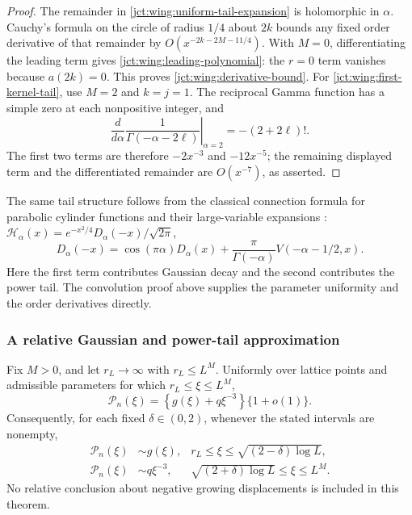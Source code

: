 \begin{proof}
The remainder in \eqref{jct:wing:uniform-tail-expansion} is
holomorphic in $\alpha$.  Cauchy's formula on the circle of radius
$1/4$ about $2k$ bounds any fixed order derivative of that remainder
by $O(x^{-2k-2M-11/4})$.  With $M=0$, differentiating the leading
term gives \eqref{jct:wing:leading-polynomial}: the $r=0$ term vanishes
because $a(2k)=0$.  This proves \eqref{jct:wing:derivative-bound}.
For \eqref{jct:wing:first-kernel-tail}, use $M=2$ and $k=j=1$.
The reciprocal Gamma function has a simple zero at each
nonpositive integer, and
\[
 \left.\frac{d}{d\alpha}\frac1{\Gamma(-\alpha-2\ell)}
                         \right|_{\alpha=2}
 =-(2+2\ell)!.
\]
The first two terms are therefore $-2x^{-3}$ and $-12x^{-5}$;
the remaining displayed term and the differentiated remainder are
$O(x^{-7})$, as asserted.
\end{proof}

The same tail structure follows from the classical connection formula
for parabolic cylinder functions and their large-variable expansions \cite{jct:cylinder}:
$\mathcal H_\alpha(x)=e^{-x^2/4}D_\alpha(-x)/\sqrt{2\pi}$,
\[
 D_\alpha(-x)=\cos(\pi\alpha)D_\alpha(x)
       +\frac{\pi}{\Gamma(-\alpha)}V(-\alpha-1/2,x).
\]
Here the first term contributes Gaussian decay and the second
contributes the power tail.  The convolution proof above supplies
the parameter uniformity and the order derivatives directly.

\subsubsection{A relative Gaussian and power-tail approximation}

\begin{theorem}
\label{jct:thm:positive-windows}
Fix $M>0$, and let $r_L\to\infty$ with $r_L\le L^M$.
Uniformly over lattice points and admissible parameters for which
$r_L\le\xi\le L^M$,
\begin{equation}\label{jct:wing:relative-mixture}
 \mathcal P_n(\xi)
 =\left\{g(\xi)+q\xi^{-3}\right\}\{1+o(1)\}.
\end{equation}
Consequently, for each fixed $\delta\in(0,2)$, whenever the stated
intervals are nonempty,
\begin{align}
 \mathcal P_n(\xi)&\sim g(\xi),
 &r_L\le\xi\le\sqrt{(2-\delta)\log L},
                       \label{jct:wing:gaussian-window}\\
 \mathcal P_n(\xi)&\sim q\xi^{-3},
 &\sqrt{(2+\delta)\log L}\le\xi\le L^M.
                       \label{jct:wing:power-window}
\end{align}
No relative conclusion about negative growing displacements is
included in this theorem.
\end{theorem}

